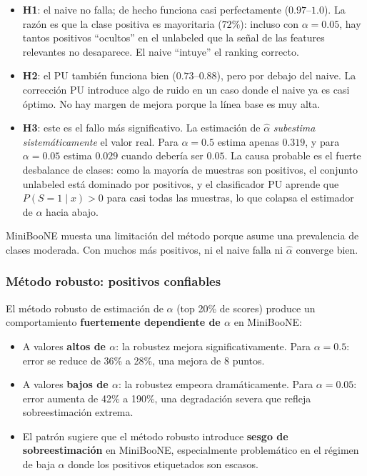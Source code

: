 \documentclass[a4paper,11pt]{article}
\begin{document}
\begin{itemize}
    \item \textbf{H1}: el naive no falla; de hecho funciona casi perfectamente ($0.97$--$1.0$). La razón es que la clase positiva es mayoritaria ($72\%$): incluso con $\alpha = 0.05$, hay tantos positivos ``ocultos'' en el unlabeled que la señal de las features relevantes no desaparece. El naive ``intuye'' el ranking correcto.
    \item \textbf{H2}: el PU también funciona bien ($0.73$--$0.88$), pero por debajo del naive. La corrección PU introduce algo de ruido en un caso donde el naive ya es casi óptimo. No hay margen de mejora porque la línea base es muy alta.
    \item \textbf{H3}: este es el fallo más significativo. La estimación de $\hat{\alpha}$ \emph{subestima sistemáticamente} el valor real. Para $\alpha = 0.5$ estima apenas $0.319$, y para $\alpha = 0.05$ estima $0.029$ cuando debería ser $0.05$. La causa probable es el fuerte desbalance de clases: como la mayoría de muestras son positivos, el conjunto unlabeled está dominado por positivos, y el clasificador PU aprende que $P(S=1 \mid x) > 0$ para casi todas las muestras, lo que colapsa el estimador de $\alpha$ hacia abajo.
\end{itemize}

MiniBooNE muesta una limitación del método porque asume una prevalencia de clases moderada. Con muchos más positivos, ni el naive falla ni $\hat{\alpha}$ converge bien.
\subsubsection{Método robusto: positivos confiables}

El método robusto de estimación de $\alpha$ (top 20\% de scores) produce un comportamiento \textbf{fuertemente dependiente de $\alpha$} en MiniBooNE:

\begin{itemize}
    \item A valores \textbf{altos de $\alpha$}: la robustez mejora significativamente. Para $\alpha=0.5$: error se reduce de 36\% a 28\%, una mejora de 8 puntos.
    \item A valores \textbf{bajos de $\alpha$}: la robustez empeora dramáticamente. Para $\alpha=0.05$: error aumenta de 42\% a 190\%, una degradación severa que refleja sobreestimación extrema.
    \item El patrón sugiere que el método robusto introduce \textbf{sesgo de sobreestimación} en MiniBooNE, especialmente problemático en el régimen de baja $\alpha$ donde los positivos etiquetados son escasos.
\end{itemize}
\end{document}
